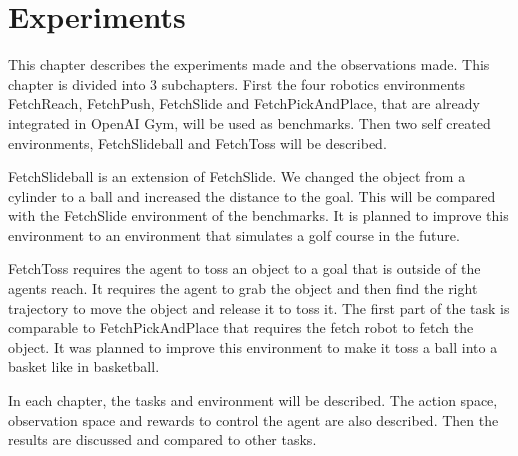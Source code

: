 \chapter{Experiments}

This chapter describes the experiments made and the observations made. This chapter is divided into 3 subchapters.
\newline
First the four robotics environments FetchReach, FetchPush, FetchSlide and FetchPickAndPlace, that are already integrated in OpenAI Gym, will be used as benchmarks.
Then two self created environments, FetchSlideball and FetchToss will be described.

\vspace{0.5cm}

FetchSlideball is an extension of FetchSlide. We changed the object from a cylinder to a ball and increased the distance to the goal. This will be compared with the FetchSlide environment of the benchmarks. It is planned to improve this environment to an environment that simulates a golf course in the future.

\vspace{0.5cm}

FetchToss requires the agent to toss an object to a goal that is outside of the agents reach. It requires the agent to grab the object and then find the right trajectory to move the object and release it to toss it. The first part of the task is comparable to FetchPickAndPlace that requires the fetch robot to fetch the object. It was planned to improve this environment to make it toss a ball into a basket like in basketball.

\vspace{0.5cm}

In each chapter, the tasks and environment will be described. The action space, observation space and rewards to control the agent are also described. Then the results are discussed and compared to other tasks.   








